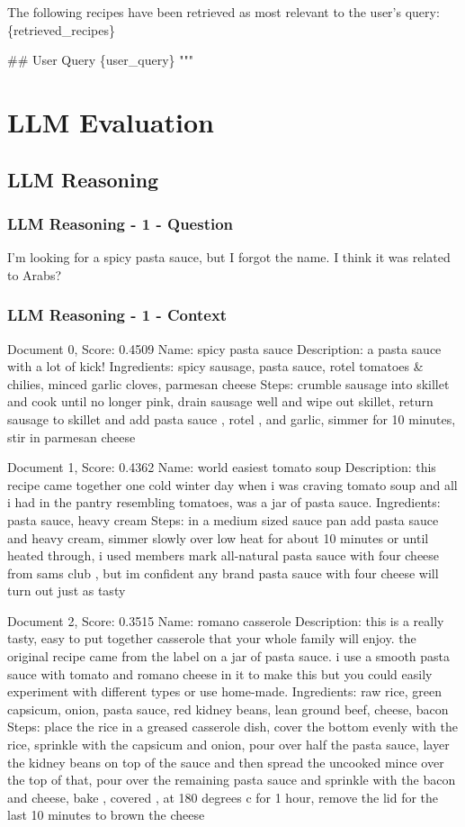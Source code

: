 \documentclass[a4paper,11pt]{article}
\begin{document}
The following recipes have been retrieved as most relevant to the user's query:
\{retrieved\_recipes\}   

\#\# User Query
\{user\_query\}
"""



\section{LLM Evaluation}

\subsection{LLM Reasoning }

\subsubsection{LLM Reasoning - 1 - Question}
I'm looking for a spicy pasta sauce, but I forgot the name. I think it was related to Arabs?

\subsubsection{LLM Reasoning - 1 - Context}
Document 0, Score: 0.4509
Name: spicy pasta sauce
Description: a pasta sauce with a lot of kick!
Ingredients: spicy sausage, pasta sauce, rotel tomatoes \& chilies, minced garlic cloves, parmesan cheese
Steps: crumble sausage into skillet and cook until no longer pink, drain sausage well and wipe out skillet, return sausage to skillet and add pasta sauce , rotel , and garlic, simmer for 10 minutes, stir in parmesan cheese

Document 1, Score: 0.4362
Name: world easiest tomato soup
Description: this recipe came together one cold winter day when i was craving tomato soup and all i had in the pantry resembling tomatoes, was a jar of pasta sauce.
Ingredients: pasta sauce, heavy cream
Steps: in a medium sized sauce pan add pasta sauce and heavy cream, simmer slowly over low heat for about 10 minutes or until heated through, i used members mark all-natural pasta sauce with four cheese from sams club , but im confident any brand pasta sauce with four cheese will turn out just as tasty

Document 2, Score: 0.3515
Name: romano casserole
Description: this is a really tasty, easy to put together casserole that your whole family will enjoy. the original recipe came from the label on a jar of pasta sauce. i use a smooth pasta sauce with tomato and romano cheese in it to make this but you could easily experiment with different types or use home-made.
Ingredients: raw rice, green capsicum, onion, pasta sauce, red kidney beans, lean ground beef, cheese, bacon
Steps: place the rice in a greased casserole dish, cover the bottom evenly with the rice, sprinkle with the capsicum and onion, pour over half the pasta sauce, layer the kidney beans on top of the sauce and then spread the uncooked mince over the top of that, pour over the remaining pasta sauce and sprinkle with the bacon and cheese, bake , covered , at 180 degrees c for 1 hour, remove the lid for the last 10 minutes to brown the cheese
\end{document}
